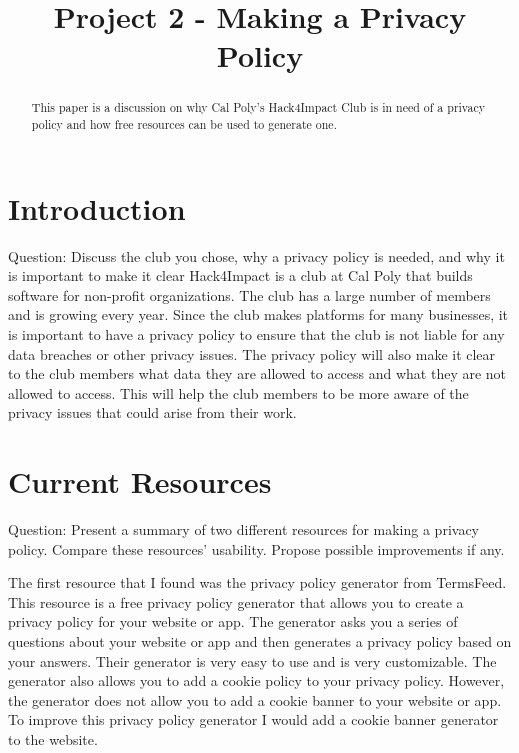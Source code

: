 \documentclass[conference]{IEEEtran}
\begin{document}
\title{Project 2 - Making a Privacy Policy\\
}

\author{
}

\maketitle

\begin{abstract}
This paper is a discussion on why Cal Poly's Hack4Impact Club is in need of
a privacy policy and how free resources can be used to generate one.
\end{abstract}

\section{Introduction}
Question: Discuss the club you chose, why a privacy policy is needed, and why
it is important to make it clear
Hack4Impact is a club at Cal Poly that builds software for non-profit
organizations. The club has a large number of members and is growing
every year. Since the club makes platforms for many businesses, it is
important to have a privacy policy to ensure that the club is not
liable for any data breaches or other privacy issues. The privacy
policy will also make it clear to the club members what data they are
allowed to access and what they are not allowed to access. This will
help the club members to be more aware of the privacy issues that
could arise from their work.

\section{Current Resources}
Question: Present a summary of two different resources for making a privacy
policy. Compare these resources' usability. Propose possible improvements if
any.

The first resource that I found was the privacy policy generator from
TermsFeed. This resource is a free privacy policy generator that
allows you to create a privacy policy for your website or app. The
generator asks you a series of questions about your website or app
and then generates a privacy policy based on your answers. Their generator
is very easy to use and is very customizable. The generator also
allows you to add a cookie policy to your privacy policy. However, the
generator does not allow you to add a cookie banner to your website
or app. To improve this privacy policy generator I would add a cookie
banner generator to the website.
\end{document}
